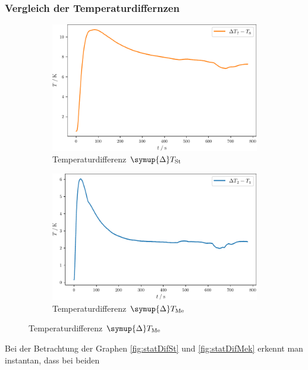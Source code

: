 \subsubsection{Vergleich der Temperaturdiffernzen}
\begin{figure}
  \begin{subfigure}{0.48\textwidth}
    \centering
    \includegraphics[width = \textwidth]{build/statDifSt.pdf}
    \caption{Temperaturdifferenz $\symup{\Delta}T_\text{St}$}
    \label{fig:statDifSt}
  \end{subfigure}
  \begin{subfigure}{0.48\textwidth}
    \centering
    \includegraphics[width = \textwidth]{build/statDifMek.pdf}
    \caption{Temperaturdifferenz $\symup{\Delta}T_\text{Me}$}
    \label{fig:statDifMek}
  \end{subfigure}
\end{figure}
Bei der Betrachtung der Graphen \eqref{fig:statDifSt} und \eqref{fig:statDifMek} erkennt man instantan, dass bei beiden

